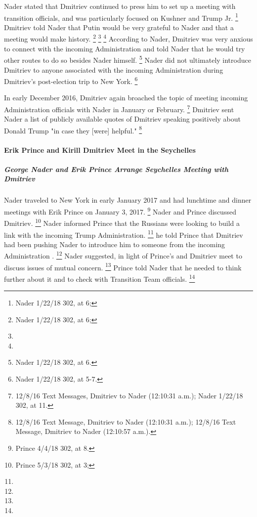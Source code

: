 Nader stated that Dmitriev continued to press him to set up a meeting with transition officials, and was particularly focused on Kushner and Trump Jr.%
\footnote{Nader 1/22/18 302, at 6;
}
Dmitriev told Nader that Putin would be very grateful to Nader and that a meeting would make history.%
\footnote{Nader 1/22/18 302, at 6;
}
\footnote{}
\footnote{}
According to Nader, Dmitriev was very anxious to connect with the incoming Administration and told Nader that he would try other routes to do so besides Nader himself.%
\footnote{Nader 1/22/18 302, at 6.}
Nader did not ultimately introduce Dmitriev to anyone associated with the incoming Administration during Dmitriev's post-election trip to New York.%
\footnote{Nader 1/22/18 302, at 5-7.}

In early December 2016, Dmitriev again broached the topic of meeting incoming Administration officials with Nader in January or February.%
\footnote{12/8/16 Text Messages, Dmitriev to Nader (12:10:31 a.m.);
Nader 1/22/18 302, at 11.}
Dmitriev sent Nader a list of publicly available quotes of Dmitriev speaking positively about Donald Trump "in case they [were] helpful."%
\footnote{12/8/16 Text Message, Dmitriev to Nader (12:10:31 a.m.);
12/8/16 Text Message, Dmitriev to Nader (12:10:57 a.m.).}

\paragraph{Erik Prince and Kirill Dmitriev Meet in the Seychelles}

\subparagraph{George Nader and Erik Prince Arrange Seychelles Meeting with Dmitriev}

Nader traveled to New York in early January 2017 and had lunchtime and dinner meetings with Erik Prince on January 3, 2017.%
\footnote{Prince 4/4/18 302, at 8.}
Nader and Prince discussed Dmitriev.%
\footnote{Prince 5/3/18 302, at 3; }
Nader informed Prince that the Russians were looking to build a link with the incoming Trump Administration.%
\footnote{}
he told Prince that Dmitriev had been pushing Nader to introduce him to someone from the incoming Administration
.%
\footnote{}
Nader suggested, in light of Prince's and Dmitriev meet to discuss issues of mutual concern.%
\footnote{}
Prince told Nader that he needed to think further about it and to check with Transition Team officials.%
\footnote{}

